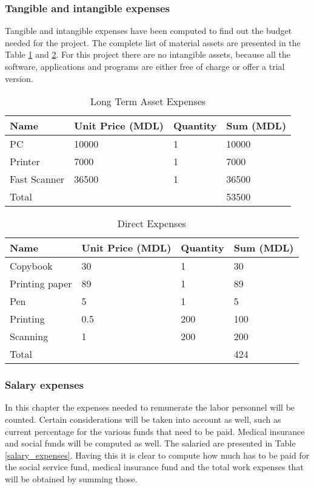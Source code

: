 \subsubsection{Tangible and intangible expenses}
Tangible and intangible expenses have been computed to find out the budget needed for the project. The complete list of material assets are presented in the Table \ref{longterm_asset_expenses} and \ref{direct_expenses}. For this project there are no intangible assets, because all the software, applications and programs are either free of charge or offer a trial version. 

\begin{table}[ht!]
\centering
\caption{Long Term Asset Expenses}
{
\renewcommand{\arraystretch}{1.25}
\begin{tabular}{ llll }
\hline
  Name & Unit Price (MDL) & Quantity & Sum (MDL) \\ \hline
  PC & 10000 & 1 & 10000 \\
  Printer & 7000 & 1 & 7000 \\
  Fast Scanner & 36500 & 1 & 36500 \\
  Total & & & 53500 \\
\hline
\end{tabular}
}
\label{longterm_asset_expenses}
\end{table}

\begin{table}[ht!]
\centering
\caption{Direct Expenses}
{
\renewcommand{\arraystretch}{1.25}
\begin{tabular}{ llll }
\hline
  Name & Unit Price (MDL) & Quantity & Sum (MDL) \\ \hline
  Copybook & 30 & 1 & 30 \\
  Printing paper & 89 & 1 & 89 \\
  Pen & 5 & 1 & 5 \\
  Printing & 0.5 & 200 & 100 \\
  Scanning & 1 & 200 & 200 \\
  Total & & & 424 \\
\hline
\end{tabular}
}
\label{direct_expenses}
\end{table}


\subsubsection{Salary expenses}
In this chapter the expenses needed to remunerate the labor personnel will be counted. Certain considerations will be taken into account as well, such as current percentage for the various funds that need to be paid. Medical insurance and social funds will be computed as well. The salaried are presented in Table \ref{salary_expenses}. Having this it is clear to compute how much has to be paid for the social service fund, medical insurance fund and the total work expenses that will be obtained by summing those. 


